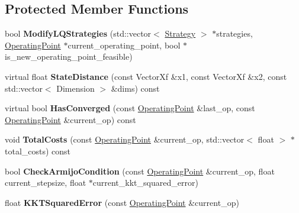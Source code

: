 \subsection*{Protected Member Functions}
\begin{DoxyCompactItemize}
\item 
bool {\bfseries Modify\+L\+Q\+Strategies} (std\+::vector$<$ \hyperlink{structilqgames_1_1_strategy}{Strategy} $>$ $\ast$strategies, \hyperlink{structilqgames_1_1_operating_point}{Operating\+Point} $\ast$current\+\_\+operating\+\_\+point, bool $\ast$is\+\_\+new\+\_\+operating\+\_\+point\+\_\+feasible)\hypertarget{classilqgames_1_1_i_l_q_solver_ada2e91b02b1e88947540dc3f9bbae7f0}{}\label{classilqgames_1_1_i_l_q_solver_ada2e91b02b1e88947540dc3f9bbae7f0}

\item 
virtual float {\bfseries State\+Distance} (const Vector\+Xf \&x1, const Vector\+Xf \&x2, const std\+::vector$<$ Dimension $>$ \&dims) const \hypertarget{classilqgames_1_1_i_l_q_solver_aee7f2cfccde0664200d62f92ed5e0606}{}\label{classilqgames_1_1_i_l_q_solver_aee7f2cfccde0664200d62f92ed5e0606}

\item 
virtual bool {\bfseries Has\+Converged} (const \hyperlink{structilqgames_1_1_operating_point}{Operating\+Point} \&last\+\_\+op, const \hyperlink{structilqgames_1_1_operating_point}{Operating\+Point} \&current\+\_\+op) const \hypertarget{classilqgames_1_1_i_l_q_solver_a16009dd589014a579b8b8ec5cbe89e87}{}\label{classilqgames_1_1_i_l_q_solver_a16009dd589014a579b8b8ec5cbe89e87}

\item 
void {\bfseries Total\+Costs} (const \hyperlink{structilqgames_1_1_operating_point}{Operating\+Point} \&current\+\_\+op, std\+::vector$<$ float $>$ $\ast$total\+\_\+costs) const \hypertarget{classilqgames_1_1_i_l_q_solver_acf0f45f07d5484a9a60b3a2e1db1647a}{}\label{classilqgames_1_1_i_l_q_solver_acf0f45f07d5484a9a60b3a2e1db1647a}

\item 
bool {\bfseries Check\+Armijo\+Condition} (const \hyperlink{structilqgames_1_1_operating_point}{Operating\+Point} \&current\+\_\+op, float current\+\_\+stepsize, float $\ast$current\+\_\+kkt\+\_\+squared\+\_\+error)\hypertarget{classilqgames_1_1_i_l_q_solver_a4e7525bb720f83e255dac165f0bbeb57}{}\label{classilqgames_1_1_i_l_q_solver_a4e7525bb720f83e255dac165f0bbeb57}

\item 
float {\bfseries K\+K\+T\+Squared\+Error} (const \hyperlink{structilqgames_1_1_operating_point}{Operating\+Point} \&current\+\_\+op)\hypertarget{classilqgames_1_1_i_l_q_solver_a9845b60307967eca6aa6897897d5ee69}{}\label{classilqgames_1_1_i_l_q_solver_a9845b60307967eca6aa6897897d5ee69}


\end{DoxyCompactItemize}
